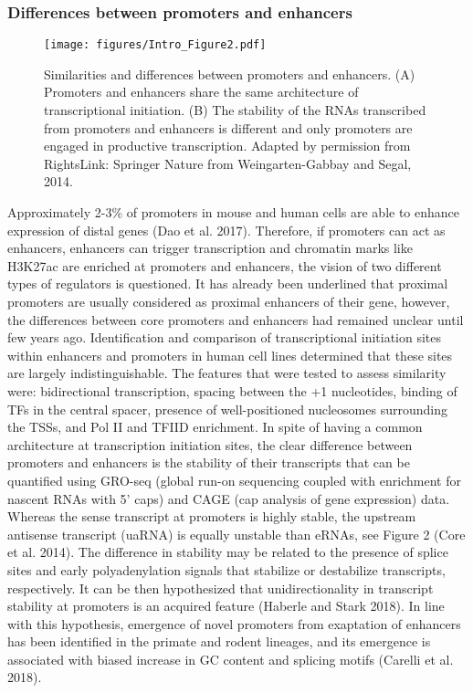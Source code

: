 		\subsubsection{Differences between promoters and enhancers}


		\begin{figure}[h!]
			\centering
			\texttt{[image: figures/Intro\_Figure2.pdf]}
  			\caption[intro2]{Similarities and differences between promoters and enhancers. (A) Promoters and enhancers share the same architecture of transcriptional initiation. (B) The stability of the RNAs transcribed from promoters and enhancers is different and only promoters are engaged in productive transcription. Adapted by permission from RightsLink: Springer Nature from Weingarten-Gabbay and Segal, 2014.}
			\label{intro2}
		\end{figure}


Approximately 2-3\% of promoters in mouse and human cells are able to enhance expression of distal genes (Dao et al. 2017). Therefore, if promoters can act as enhancers, enhancers can trigger transcription and chromatin marks like H3K27ac are enriched at promoters and enhancers, the vision of two different types of regulators is questioned. It has already been underlined that proximal promoters are usually considered as proximal enhancers of their gene, however, the differences between core promoters and enhancers had remained unclear until few years ago. Identification and comparison of transcriptional initiation sites within enhancers and promoters in human cell lines determined that these sites are largely indistinguishable. The features that were tested to assess similarity were: bidirectional transcription, spacing between the +1 nucleotides, binding of TFs in the central spacer, presence of well-positioned nucleosomes surrounding the TSSs, and Pol II and TFIID enrichment. In spite of having a common architecture at transcription initiation sites, the clear difference between promoters and enhancers is the stability of their transcripts that can be quantified using GRO-seq (global run-on sequencing coupled with enrichment for nascent RNAs with 5’ caps) and CAGE (cap analysis of gene expression) data. Whereas the sense transcript at promoters is highly stable, the upstream antisense transcript (uaRNA) is equally unstable than eRNAs, see Figure 2 (Core et al. 2014). The difference in stability may be related to the presence of splice sites and early polyadenylation signals that stabilize or destabilize transcripts, respectively. It can be then hypothesized that unidirectionality in transcript stability at promoters is an acquired feature (Haberle and Stark 2018). In line with this hypothesis, emergence of novel promoters from exaptation of enhancers has been identified in the primate and rodent lineages, and its emergence is associated with biased increase in GC content and splicing motifs (Carelli et al. 2018).\\


